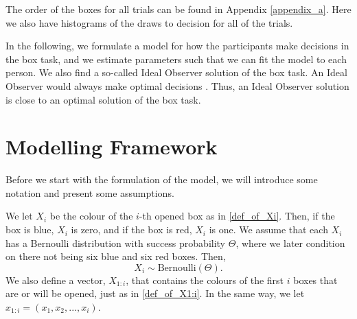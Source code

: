 The order of the boxes for all trials can be found in Appendix \ref{appendix_a}. Here we also have histograms of the draws to decision for all of the trials.

In the following, we formulate a model for how the participants make decisions in the box task, and we estimate parameters such that we can fit the model to each person. We also find a so-called Ideal Observer solution of the box task. An Ideal Observer would always make optimal decisions \citep{idealObs}. Thus, an Ideal Observer solution is close to an optimal solution of the box task.  



\section{Modelling Framework}
\label{section_notation}
Before we start with the formulation of the model, we will introduce some notation and present some assumptions. 

We let $X_i$ be the colour of the $i$-th opened box as in \eqref{def_of_Xi}. Then, if the box is blue, $X_i$ is zero, and if the box is red, $X_i$ is one.
We assume that each $X_i$ has a Bernoulli distribution with success probability $\Theta$, where we later condition on there not being six blue and six red boxes. Then,
\begin{equation*}
    X_i \sim \text{Bernoulli}(\Theta).
\end{equation*}
We also define a vector, $X_{1:i}$, that contains the colours of the first $i$ boxes that are or will be opened, just as in \eqref{def_of_X1:i}. In the same way, we let $x_{1:i} = (x_1,x_2,...,x_{i})$.

